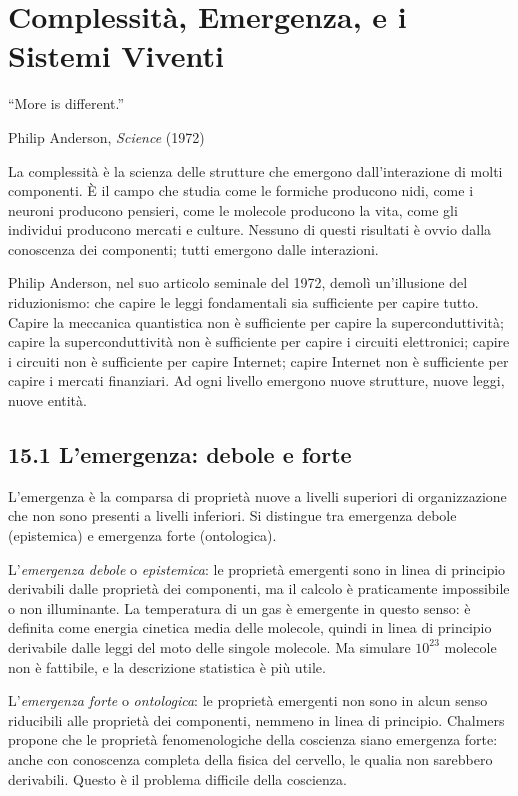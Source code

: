 \documentclass[11.5pt,a4paper,openany]{book}
\theoremstyle{remark}
\begin{document}
\chapter{Complessità, Emergenza, e i Sistemi Viventi}

\epigraph{``More is different.''}{Philip Anderson, \textit{Science} (1972)}

La complessità è la scienza delle strutture che emergono dall'interazione di molti componenti. È il campo che studia come le formiche producono nidi, come i neuroni producono pensieri, come le molecole producono la vita, come gli individui producono mercati e culture. Nessuno di questi risultati è ovvio dalla conoscenza dei componenti; tutti emergono dalle interazioni.

Philip Anderson, nel suo articolo seminale del 1972, demolì un'illusione del riduzionismo: che capire le leggi fondamentali sia sufficiente per capire tutto. Capire la meccanica quantistica non è sufficiente per capire la superconduttività; capire la superconduttività non è sufficiente per capire i circuiti elettronici; capire i circuiti non è sufficiente per capire Internet; capire Internet non è sufficiente per capire i mercati finanziari. Ad ogni livello emergono nuove strutture, nuove leggi, nuove entità.

\section{15.1 L'emergenza: debole e forte}

L'emergenza è la comparsa di proprietà nuove a livelli superiori di organizzazione che non sono presenti a livelli inferiori. Si distingue tra emergenza debole (epistemica) e emergenza forte (ontologica).

L'\textit{emergenza debole} o \textit{epistemica}: le proprietà emergenti sono in linea di principio derivabili dalle proprietà dei componenti, ma il calcolo è praticamente impossibile o non illuminante. La temperatura di un gas è emergente in questo senso: è definita come energia cinetica media delle molecole, quindi in linea di principio derivabile dalle leggi del moto delle singole molecole. Ma simulare $10^{23}$ molecole non è fattibile, e la descrizione statistica è più utile.

L'\textit{emergenza forte} o \textit{ontologica}: le proprietà emergenti non sono in alcun senso riducibili alle proprietà dei componenti, nemmeno in linea di principio. Chalmers propone che le proprietà fenomenologiche della coscienza siano emergenza forte: anche con conoscenza completa della fisica del cervello, le qualia non sarebbero derivabili. Questo è il problema difficile della coscienza.
\end{document}
